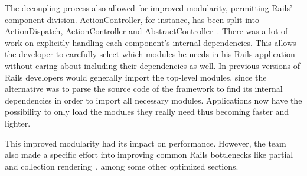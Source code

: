 The decoupling process also allowed for improved modularity, permitting Rails' component division. ActionController, for instance, has been split into ActionDispatch, ActionController and AbstractController~\cite{vaporware_to_awesome}. There was a lot of work on explicitly handling each component's internal dependencies. This allows the developer to carefully select which modules he needs in his Rails application without caring about including their dependencies as well. In previous versions of Rails developers would generally import the top-level modules, since the alternative was to parse the source code of the framework to find its internal dependencies in order to import all necessary modules. Applications now have the possibility to only load the modules they really need thus becoming faster and lighter.

This improved modularity had its impact on performance. However, the team also made a specific effort into improving common Rails bottlenecks like partial and collection rendering~\cite{vaporware_to_awesome}, among some other optimized sections.

